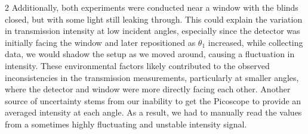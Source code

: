 \documentclass[a4paper,oneside,article]{memoir}
\begin{document}
\begin{multicols}{2}
Additionally, both experiments were conducted near a window with the blinds closed, but with some light still leaking through. This could explain the variation in transmission intensity at low incident angles, especially since the detector was initially facing the window and later repositioned as $θ_1$ increased, while collecting data, we would shadow the setup as we moved around, causing a fluctuation in intensity. These environmental factors likely contributed to the observed inconsistencies in the transmission measurements, particularly at smaller angles, where the detector and window were more directly facing each other. Another source of uncertainty stems from our inability to get the Picoscope to provide an averaged intensity at each angle. As a result, we had to manually read the values from a sometimes highly fluctuating and unstable intensity signal.













\end{multicols}
\end{document}
